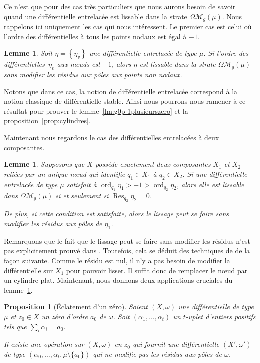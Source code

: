 \documentclass[JEP,XML,SOM,Unicode,francais,NoFloatCountersInSection,published]{cedram}
\let\mathcal\mathscr
\DeclareMathOperator{\ord}{ord}
\newcommand\Res{\operatorname{Res}}
\newcommand{\omoduli}[1][g]{{\Omega\mathcal M}_{\!#1}}
\newtheorem{prop}[thm]{Proposition}
\newtheorem{lem}[thm]{Lemme}
\theoremstyle{definition}
\begin{document}
Ce n'est que pour des cas très particuliers que nous aurons besoin de savoir quand une différentielle entrelacée est lissable dans la strate $\omoduli(\mu)$. Nous rappelons ici uniquement les cas qui nous intéressent. Le premier cas est celui où l'ordre des différentielles à tous les points nodaux est égal à $-1$.
\begin{lem}\label{lem:lisspolessimples}
Soit $\eta=\left\{\eta_{v}\right\}$ une différentielle entrelacée de type $\mu$. Si l'ordre des différentielles~$\eta_v$ aux nœuds est $-1$, alors $\eta$ est lissable dans la strate $\omoduli(\mu)$ sans modifier les résidus aux pôles aux points non nodaux.
\end{lem}
Notons que dans ce cas, la notion de différentielle entrelacée correspond à la notion classique de différentielle stable. Ainsi nous pourrons nous ramener à ce résultat pour prouver le lemme~\ref{lm:g0p-1plusieurszero} et la proposition~\ref{prop:cylindres}.

Maintenant nous regardons le cas des différentielles entrelacées à deux composantes.
\begin{lem}\label{lem:lissdeuxcomp}
Supposons que $X$ possède exactement deux composantes $X_{1}$ et $X_{2}$ reliées par un unique nœud qui identifie $q_1 \in X_{1}$ à $q_2 \in X_{2}$. Si une différentielle entrelacée de type $\mu$ satisfait à $\ord_{q_1} \eta_{1}>-1>\ord_{q_2} \eta_{2}$, alors elle est lissable dans $\omoduli(\mu)$ si et seulement si $\Res_{q_2}\eta_{2}=0$.

De plus, si cette condition est satisfaite, alors le lissage peut se faire sans modifier les résidus aux pôles de $\eta_{1}$.
\end{lem}
Remarquons que le fait que le lissage peut se faire sans modifier les résidus n'est pas explicitement prouvé dans \cite{BCGGM}. Toutefois, cela se déduit des techniques de \cite{BCGGM} de la façon suivante. Comme le résidu est nul, il n'y a pas besoin de modifier la différentielle sur $X_{1}$ pour pouvoir lisser. Il suffit donc de remplacer le nœud par un cylindre plat.
Maintenant, nous donnons deux applications cruciales du lemme~\ref{lem:lissdeuxcomp}.
\begin{prop}[Éclatement d'un zéro]\label{prop:eclatZero}
Soient $(X,\omega)$ une différentielle de type $\mu$ et $z_{0}\in X$ un zéro d'ordre $a_{0}$ de $\omega$. Soit $(\alpha_{1},\dots,\alpha_{t})$ un $t$-uplet d'entiers positifs tels que $\sum_{i}\alpha_{i}=a_{0}$.

Il existe une opération sur $(X,\omega)$ en $z_{0}$ qui fournit une différentielle $(X',\omega')$ de type $(\alpha_{0},\dots,\alpha_{t},\mu\setminus\lbrace a_{0}\rbrace)$ qui ne modifie pas les résidus aux pôles de $\omega$.
\end{prop}
\end{document}
